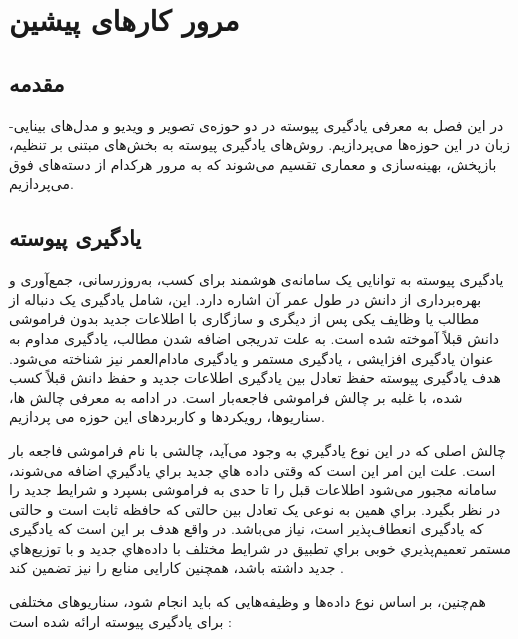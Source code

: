 \chapter{مرور کارهای پیشین}
\section{مقدمه}
در این فصل به معرفی یادگیری پیوسته در دو حوزه‌ی تصویر و ویدیو و مدل‌های بینایی-زبان در این حوزه‌ها می‌پردازیم. روش‌های یادگیری پیوسته به بخش‌های مبتنی بر تنظیم، بازپخش، بهینه‌سازی و معماری تقسیم می‌شوند که به مرور هرکدام از دسته‌های فوق می‌پردازیم. 

\section{یادگیری پیوسته}
یادگیری پیوسته به توانایی یک سامانه‌ی هوشمند برای کسب، به‌روزرسانی، جمع‌آوری و بهره‌برداری از دانش در طول عمر آن اشاره دارد. این، شامل یادگیری یک دنباله از مطالب یا وظایف یکی پس از دیگری و سازگاری با اطلاعات جدید بدون فراموشی دانش قبلاً آموخته شده است. به علت تدریجی اضافه شدن مطالب، یادگیری مداوم به عنوان یادگیری افزایشی ، یادگیری مستمر  و یادگیری مادام‌العمر  نیز شناخته می‌شود. هدف یادگیری پیوسته حفظ تعادل بین یادگیری اطلاعات جدید و حفظ دانش قبلاً کسب شده، با غلبه بر چالش فراموشی فاجعه‌بار است. در ادامه به معرفی چالش ها، سناریوها، رویکردها و کاربردهای این حوزه می پردازیم.


چالش اصلی که در این نوع یادگیري به وجود می‌آید، چالشی با نام فراموشی فاجعه بار است. علت این امر این است که وقتی داده هاي جدید براي یادگیري اضافه می‌شوند، سامانه مجبور می‌شود اطلاعات قبل را تا حدی به فراموشی بسپرد و شرایط جدید را در نظر بگیرد. براي همین به نوعی یک تعادل بین حالتی که حافظه ثابت است و حالتی که یادگیری انعطاف‌پذیر است، نیاز می‌باشد. در واقع هدف بر این است که یادگیری مستمر تعمیم‌پذیري خوبی براي تطبیق در شرایط مختلف با داده‌هاي جدید و با توزیع‌هاي جدید داشته باشد، همچنین کارایی منابع را نیز تضمین کند 
\cite{1, 2}
.

هم‌چنین، بر اساس نوع داده‌ها و وظیفه‌هایی که باید انجام شود، سناریوهای مختلفی برای یادگیری پیوسته ارائه شده است 
\cite{1}:

